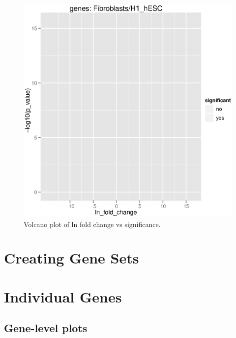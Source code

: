 \documentclass[10pt]{article}
\begin{document}
\begin{figure}[ht]
\begin{center}
\includegraphics{cummeRbund-manual-global_plots_volcano}
\end{center}
\caption{Volcano plot of ln fold change vs significance.}
\end{figure}

\clearpage

\section{Creating Gene Sets}


\section{Individual Genes}

\subsection{Gene-level plots}
\end{document}

